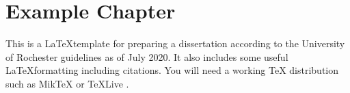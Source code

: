 \documentclass[\main/master.tex]{subfiles}
\begin{document}
\chapter{Example Chapter}\label{chp:example-1}
\hspace{5 mm} This is a \LaTeX template for preparing a dissertation according to the University of Rochester guidelines \cite{uofr_guidelines} as of July 2020. It also includes some useful \LaTeX formatting including citations. You will need a working TeX distribution such as MikTeX \cite{miktex_home} or TeXLive \cite{texlive_nodate}. 
\end{document}
